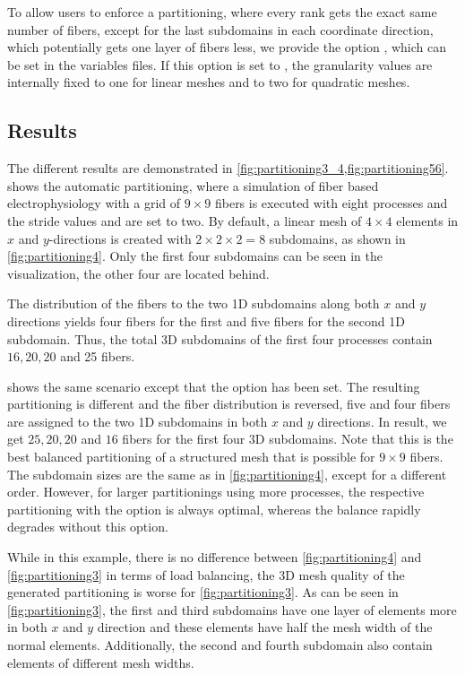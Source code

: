 To allow users to enforce a partitioning, where every rank gets the exact same number of fibers, except for the last subdomains in each coordinate direction, which potentially gets one layer of fibers less, we provide the option , which can be set in the variables files. If this option is set to , the granularity values are internally fixed to one for linear meshes and to two for quadratic meshes.

\subsection{Results}\label{sec:partitioning_results}

The different results are demonstrated in \cref{fig:partitioning3_4,fig:partitioning56}.  shows the automatic partitioning, where a simulation of fiber based electrophysiology with a grid of $9 \times 9$ fibers is executed with eight processes and the stride values  and  are set to two.
By default, a linear mesh of $4\times 4$ elements in $x$ and $y$-directions is created with $2\times 2 \times 2=8$ subdomains, as shown in \cref{fig:partitioning4}. Only the first four subdomains can be seen in the visualization, the other four are located behind. 

The distribution of the fibers to the two 1D subdomains along both $x$ and $y$ directions yields four fibers for the first and five fibers for the second 1D subdomain. Thus, the total 3D subdomains of the first four processes contain $16,20,20$ and 25 fibers.

 shows the same scenario except that the option  has been set. The resulting partitioning is different and the fiber distribution is reversed, five and four fibers are assigned to the two 1D subdomains in both $x$ and $y$ directions. In result, we get $25,20,20$ and $16$ fibers for the first four 3D subdomains. Note that this is the best balanced partitioning of a structured mesh that is possible for $9 \times 9$ fibers.
The subdomain sizes are the same as in \cref{fig:partitioning4}, except for a different order. However, for larger partitionings using more processes, the respective partitioning with the  option is always optimal, whereas the balance rapidly degrades without this option.

While in this example, there is no difference between \cref{fig:partitioning4}  and \cref{fig:partitioning3} in terms of load balancing, the 3D mesh quality of the generated partitioning is worse for \cref{fig:partitioning3}. As can be seen in \cref{fig:partitioning3}, the first and third subdomains have one layer of elements more in both $x$ and $y$ direction and these elements have half the mesh width of the normal elements. Additionally, the second and fourth subdomain also contain elements of different mesh widths.

